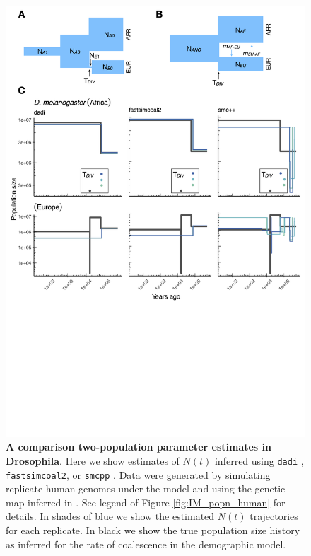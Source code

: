 \documentclass[12pt,halfline,a4paper]{ouparticle}
\newcommand{\stopsupplement}{%
        \setcounter{table}{0}
        \renewcommand{\thetable}{\arabic{table}}%
        \setcounter{figure}{0}
        \renewcommand{\thefigure}{\arabic{figure}}%
     }
\newcommand{\dadi}{\texttt{dadi} }
\newcommand{\smcpp}{\texttt{smcpp} }
\begin{document}
\begin{figure}
\begin{center}
\includegraphics[width=0.8\linewidth]{display_items/d_mel_two_popn_comp.png}
\caption{\textbf{A comparison two-population parameter estimates in Drosophila}. Here we show estimates of $N(t)$ inferred using \dadi, \texttt{fastsimcoal2}, or \smcpp.
Data were generated by simulating
replicate human genomes under the \cite{li2006inferring} model and using the genetic map
inferred in \cite{comeron2012many}. See legend of Figure \ref{fig:IM_popn_human} for details.
In shades of blue we show the estimated
$N(t)$ trajectories for each replicate. In black we show the true population size history as inferred
for the rate of coalescence in the demographic model.}
\label{fig:two_popn_fly}
\end{center}
\end{figure}

\stopsupplement
\end{document}
